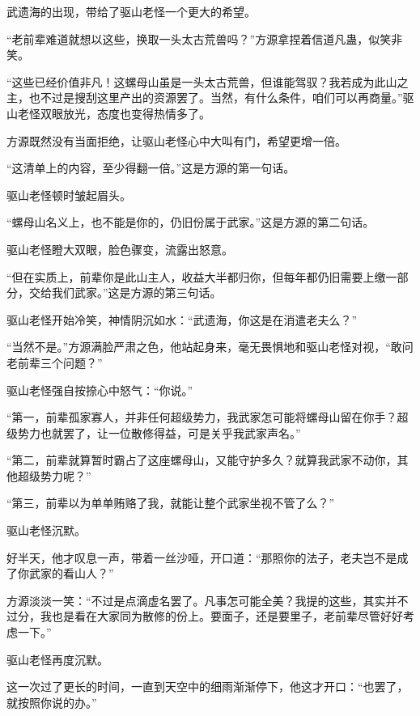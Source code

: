 \begin{this_body}
武遗海的出现，带给了驱山老怪一个更大的希望。

“老前辈难道就想以这些，换取一头太古荒兽吗？”方源拿捏着信道凡蛊，似笑非笑。

“这些已经价值非凡！这螺母山虽是一头太古荒兽，但谁能驾驭？我若成为此山之主，也不过是搜刮这里产出的资源罢了。当然，有什么条件，咱们可以再商量。”驱山老怪双眼放光，态度也变得热情多了。

方源既然没有当面拒绝，让驱山老怪心中大叫有门，希望更增一倍。

“这清单上的内容，至少得翻一倍。”这是方源的第一句话。

驱山老怪顿时皱起眉头。

“螺母山名义上，也不能是你的，仍旧份属于武家。”这是方源的第二句话。

驱山老怪瞪大双眼，脸色骤变，流露出怒意。

“但在实质上，前辈你是此山主人，收益大半都归你，但每年都仍旧需要上缴一部分，交给我们武家。”这是方源的第三句话。

驱山老怪开始冷笑，神情阴沉如水：“武遗海，你这是在消遣老夫么？”

“当然不是。”方源满脸严肃之色，他站起身来，毫无畏惧地和驱山老怪对视，“敢问老前辈三个问题？”

驱山老怪强自按捺心中怒气：“你说。”

“第一，前辈孤家寡人，并非任何超级势力，我武家怎可能将螺母山留在你手？超级势力也就罢了，让一位散修得益，可是关乎我武家声名。”

“第二，前辈就算暂时霸占了这座螺母山，又能守护多久？就算我武家不动你，其他超级势力呢？”

“第三，前辈以为单单贿赂了我，就能让整个武家坐视不管了么？”

驱山老怪沉默。

好半天，他才叹息一声，带着一丝沙哑，开口道：“那照你的法子，老夫岂不是成了你武家的看山人？”

方源淡淡一笑：“不过是点滴虚名罢了。凡事怎可能全美？我提的这些，其实并不过分，我也是看在大家同为散修的份上。要面子，还是要里子，老前辈尽管好好考虑一下。”

驱山老怪再度沉默。

这一次过了更长的时间，一直到天空中的细雨渐渐停下，他这才开口：“也罢了，就按照你说的办。”

\end{this_body}


